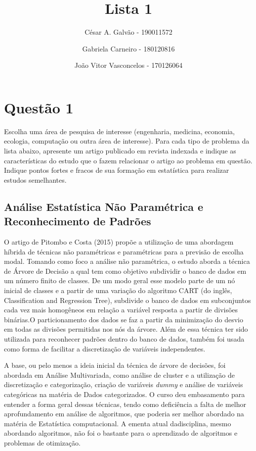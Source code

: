 \documentclass[
  a4paperpaper,
  DIV=11,
  numbers=noendperiod]{scrartcl}
\title{Lista 1}
\author{César A. Galvão - 190011572 \and Gabriela Carneiro -
180120816 \and João Vitor Vasconcelos - 170126064}
\date{}
\renewcommand*\contentsname{Índice}
\newcommand\contentsname{Índice}
\begin{document}
\maketitle

\renewcommand*\contentsname{Índice}
{
\hypersetup{linkcolor=}
\setcounter{tocdepth}{2}
\tableofcontents
}
\newpage{}

\section{Questão 1}\label{questuxe3o-1}

Escolha uma área de pesquisa de interesse (engenharia, medicina,
economia, ecologia, computação ou outra área de interesse). Para cada
tipo de problema da lista abaixo, apresente um artigo publicado em
revista indexada e indique as características do estudo que o fazem
relacionar o artigo ao problema em questão. Indique pontos fortes e
fracos de sua formação em estatística para realizar estudos semelhantes.

\subsection{Análise Estatística Não Paramétrica e Reconhecimento de
Padrões}\label{anuxe1lise-estatuxedstica-nuxe3o-paramuxe9trica-e-reconhecimento-de-padruxf5es}

O artigo de Pitombo e Costa (2015) propõe a utilização de uma abordagem
híbrida de técnicas não paramétricas e paramétricas para a previsão de
escolha modal. Tomando como foco a análise não paramétrica, o estudo
aborda a técnica de Árvore de Decisão a qual tem como objetivo
subdividir o banco de dados em um número finito de classes. De um modo
geral esse modelo parte de um nó inicial de classes e a partir de uma
variação do algoritmo CART (do inglês, Classification and Regression
Tree), subdivide o banco de dados em subconjuntos cada vez mais
homogêneos em relação a variável resposta a partir de divisões
binárias.O particionamento dos dados se faz a partir da minimização do
desvio em todas as divisões permitidas nos nós da árvore. Além de essa
técnica ter sido utilizada para reconhecer padrões dentro do banco de
dados, também foi usada como forma de facilitar a discretização de
variáveis independentes.

A base, ou pelo menos a ideia inicial da técnica de árvore de decisões,
foi abordada em Análise Multivariada, como análise de cluster e a
utilização de discretização e categorização, criação de variáveis
\emph{dummy} e análise de variáveis categóricas na matéria de Dados
categorizados. O curso deu embasamento para entender a forma geral
dessas técnicas, tendo como deficiência a falta de melhor aprofundamento
em análise de algoritmos, que poderia ser melhor abordado na matéria de
Estatística computacional. A ementa atual dadisciplina, mesmo abordando
algoritmos, não foi o bastante para o aprendizado de algoritmos e
problemas de otimização.
\end{document}
